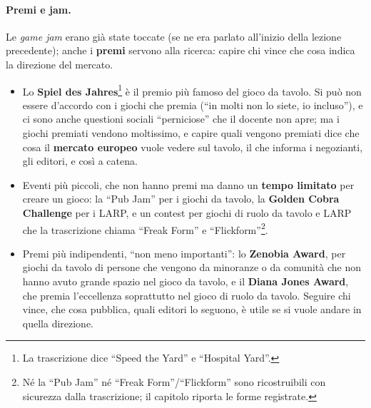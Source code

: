 \paragraph{Premi e jam.} Le \emph{game jam} erano già state toccate (se ne era parlato all'inizio della lezione precedente); anche i \textbf{premi} servono alla ricerca: capire chi vince
che cosa indica la direzione del mercato.
\begin{itemize}
  \item Lo \textbf{Spiel des Jahres}\footnote{La trascrizione dice ``Speed the Yard''
        e ``Hospital Yard''.} è il premio più famoso del gioco da tavolo. Si può non
        essere d'accordo con i giochi che premia (``in molti non lo siete, io
        incluso''), e ci sono anche questioni sociali ``perniciose'' che il docente
        non apre; ma i giochi premiati vendono moltissimo, e capire quali vengono
        premiati dice che cosa il \textbf{mercato europeo} vuole vedere sul tavolo, il
        che informa i negozianti, gli editori, e così a catena.
  \item Eventi più piccoli, che non hanno premi ma danno un \textbf{tempo limitato} per
        creare un gioco: la ``Pub Jam'' per i giochi da tavolo, la \textbf{Golden Cobra
        Challenge} per i LARP, e un contest per giochi di ruolo da tavolo e LARP che
        la trascrizione chiama ``Freak Form'' e ``Flickform''\footnote{Né la ``Pub
        Jam'' né ``Freak Form''/``Flickform'' sono ricostruibili con sicurezza dalla
        trascrizione; il capitolo riporta le forme registrate.}.
  \item Premi più indipendenti, ``non meno importanti'': lo \textbf{Zenobia Award},
        per giochi da tavolo di persone che vengono da minoranze o da comunità che
        non hanno avuto grande spazio nel gioco da tavolo, e il \textbf{Diana Jones
        Award}, che premia l'eccellenza soprattutto nel gioco di ruolo da tavolo.
        Seguire chi vince, che cosa pubblica, quali editori lo seguono, è utile se si
        vuole andare in quella direzione.
\end{itemize}

